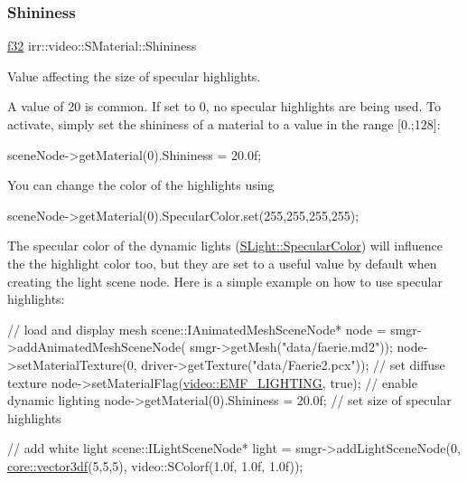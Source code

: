 \subsubsection{\texorpdfstring{Shininess}{Shininess}}
{\footnotesize\ttfamily \hyperlink{namespaceirr_a0277be98d67dc26ff93b1a6a1d086b07}{f32} irr\+::video\+::\+S\+Material\+::\+Shininess}



Value affecting the size of specular highlights. 

A value of 20 is common. If set to 0, no specular highlights are being used. To activate, simply set the shininess of a material to a value in the range \mbox{[}0.;128\mbox{]}\+: 
\begin{DoxyCode}
sceneNode->getMaterial(0).Shininess = 20.0f;
\end{DoxyCode}


You can change the color of the highlights using 
\begin{DoxyCode}
sceneNode->getMaterial(0).SpecularColor.set(255,255,255,255);
\end{DoxyCode}


The specular color of the dynamic lights (\hyperlink{structirr_1_1video_1_1SLight_a2d66ad28850a8588b2ba727103710604}{S\+Light\+::\+Specular\+Color}) will influence the the highlight color too, but they are set to a useful value by default when creating the light scene node. Here is a simple example on how to use specular highlights\+: 
\begin{DoxyCode}
\textcolor{comment}{// load and display mesh}
scene::IAnimatedMeshSceneNode* node = smgr->addAnimatedMeshSceneNode(
smgr->getMesh(\textcolor{stringliteral}{"data/faerie.md2"}));
node->setMaterialTexture(0, driver->getTexture(\textcolor{stringliteral}{"data/Faerie2.pcx"})); \textcolor{comment}{// set diffuse texture}
node->setMaterialFlag(\hyperlink{namespaceirr_1_1video_a8a3bc00ae8137535b9fbc5f40add70d3ad583050ff32bf10b7c6dd1f3c3189aa2}{video::EMF\_LIGHTING}, \textcolor{keyword}{true}); \textcolor{comment}{// enable dynamic lighting}
node->getMaterial(0).Shininess = 20.0f; \textcolor{comment}{// set size of specular highlights}

\textcolor{comment}{// add white light}
scene::ILightSceneNode* light = smgr->addLightSceneNode(0,
    \hyperlink{namespaceirr_1_1core_ae6e2b2a6c552833ebbd5b7463d03586b}{core::vector3df}(5,5,5), video::SColorf(1.0f, 1.0f, 1.0f));
\end{DoxyCode}
 \mbox{\label{classirr_1_1video_1_1SMaterial_a253c2acbafe6698e3d16b3e3a1e199ed}} 
